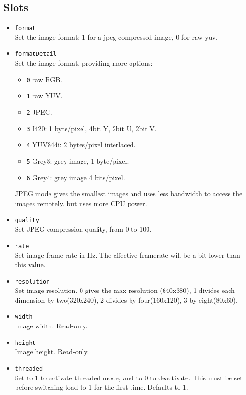 \subsection{Slots}
\begin{itemize}
\item \lstinline|format| \\
  Set the image format: 1 for a jpeg-compressed image, 0 for raw yuv.
\item \lstinline|formatDetail| \\
  Set the image format, providing more options:
  \begin{itemize}
  \item \lstinline|0| raw RGB.
  \item \lstinline|1| raw YUV.
  \item \lstinline|2| JPEG.
  \item \lstinline|3| I420: 1 byte/pixel, 4bit Y, 2bit U, 2bit V.
  \item \lstinline|4| YUV844i:  2 bytes/pixel interlaced.
  \item \lstinline|5| Grey8: grey image, 1 byte/pixel.
  \item \lstinline|6| Grey4: grey image 4 bits/pixel.
  \end{itemize}
  JPEG mode gives the smallest images and uses less bandwidth to access the
  images remotely, but uses more CPU power.
\item \lstinline|quality| \\
  Set JPEG compression quality, from 0 to 100.
\item \lstinline|rate| \\
  Set image frame rate in Hz. The effective framerate will be a bit lower than
  this value.
\item \lstinline|resolution| \\
  Set image resolution.  0 gives the max resolution (640x380), 1 divides each
  dimension by two(320x240), 2 divides by four(160x120), 3 by eight(80x60).
\item \lstinline|width| \\
  Image width. Read-only.
\item \lstinline|height| \\
  Image height. Read-only.
\item \lstinline|threaded| \\
  Set to 1 to activate threaded mode, and to 0 to deactivate. This must be set
  before switching load to 1 for the first time. Defaults to 1.
\end{itemize}

